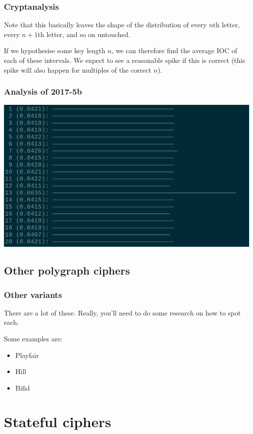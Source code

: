 \documentclass{beamer}
\begin{document}
\begin{frame}
\frametitle{Cryptanalysis}

Note that this basically leaves the shape of the distribution of every $n$th
letter, every $n + 1$th letter, and so on untouched.

If we hypothesise some key length $n$, we can therefore find the average IOC of
each of these intervals. We expect to see a reasonable spike if this is correct
(this spike will also happen for multiples of the correct $n$).
\end{frame}

\begin{frame}
\frametitle{Analysis of 2017-5b}
\includegraphics[width=\textwidth]{sel_screenshot_20181002_122703.png}
\end{frame}

\subsection{Other polygraph ciphers}

\begin{frame}
\frametitle{Other variants}

There are a lot of these. Really, you'll need to do some research on how to spot
each.

Some examples are:

\begin{itemize}
\item Playfair
\item Hill
\item Bifid
\end{itemize}

\end{frame}

\section{Stateful ciphers}
\end{document}
